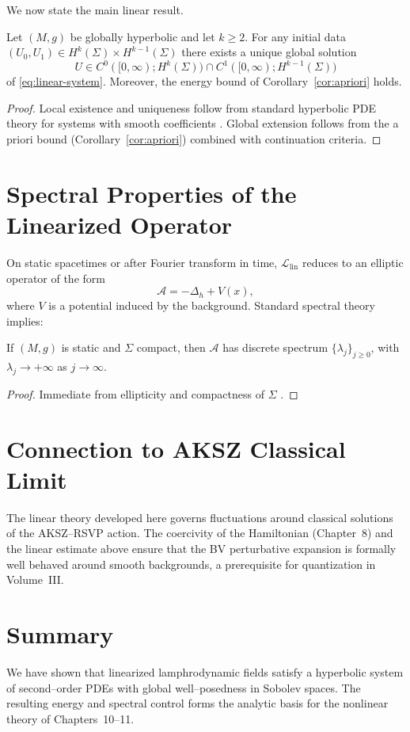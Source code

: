 We now state the main linear result.

\begin{theorem}
\label{thm:linear-wp}
Let $(M,g)$ be globally hyperbolic and let $k\ge2$.
For any initial data $(U_{0},U_{1})\in H^{k}(\Sigma)\times H^{k-1}(\Sigma)$
there exists a unique global solution
\[
U\in C^{0}([0,\infty);H^{k}(\Sigma))
 \cap C^{1}([0,\infty);H^{k-1}(\Sigma))
\]
of \eqref{eq:linear-system}.
Moreover, the energy bound of Corollary~\ref{cor:apriori} holds.
\end{theorem}

\begin{proof}[Proof]
Local existence and uniqueness follow from standard hyperbolic PDE
theory for systems with smooth coefficients
\cite{Hormander-AnalysisPDE}.
Global extension follows from the a priori bound
(Corollary~\ref{cor:apriori}) combined with continuation criteria.
\end{proof}



\section{Spectral Properties of the Linearized Operator}
\label{sec:spectral}

On static spacetimes or after Fourier transform in time,
$\mathcal{L}_{\mathrm{lin}}$ reduces to an elliptic operator of the
form
\[
\mathscr{A} = -\Delta_{h} + V(x),
\]
where $V$ is a potential induced by the background.
Standard spectral theory implies:

\begin{proposition}
\label{prop:spectral}
If $(M,g)$ is static and $\Sigma$ compact, then
$\mathscr{A}$ has discrete spectrum $\{\lambda_{j}\}_{j\ge0}$,
with $\lambda_{j}\to+\infty$ as $j\to\infty$.
\end{proposition}

\begin{proof}
Immediate from ellipticity and compactness of $\Sigma$
\cite{Taylor-PDE}.
\end{proof}



\section{Connection to AKSZ Classical Limit}
\label{sec:connection-AKSZ-classical}

The linear theory developed here governs fluctuations around classical
solutions of the AKSZ--RSVP action. The coercivity of the Hamiltonian
(Chapter~8) and the linear estimate above ensure that the BV
perturbative expansion is formally well behaved around smooth
backgrounds, a prerequisite for quantization in Volume~III.



\section{Summary}

We have shown that linearized lamphrodynamic fields satisfy a
hyperbolic system of second--order PDEs with global well--posedness
in Sobolev spaces. The resulting energy and spectral control forms the
analytic basis for the nonlinear theory of Chapters~10--11.

